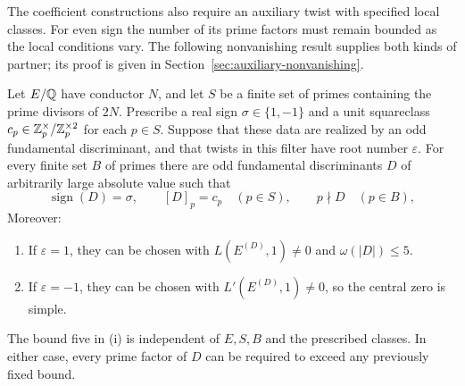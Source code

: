 The coefficient constructions also require an auxiliary twist with
specified local classes. For even sign the number of its prime factors
must remain bounded as the local conditions vary. The following
nonvanishing result supplies both kinds of partner; its proof is given
in Section~\ref{sec:auxiliary-nonvanishing}.

\begin{proposition}
\label{prop:rough-nonvanishing}\label{nv:rough}\label{nv:local-witness}
Let $E/\mathbb Q$ have conductor $N$, and let $S$ be a finite set of primes
containing the prime divisors of $2N$. Prescribe a real sign
$\sigma\in\{1,-1\}$ and a unit squareclass
$c_p\in\mathbb Z_p^\times/\mathbb Z_p^{\times2}$ for each $p\in S$.
Suppose that these data are realized by an odd fundamental discriminant,
and that twists in this filter have root number $\varepsilon$.
For every finite set $B$ of primes there are odd fundamental
discriminants $D$ of arbitrarily large absolute value such that
\[
 \operatorname{sign}(D)=\sigma,\qquad [D]_p=c_p\quad(p\in S),\qquad
 p\nmid D\quad(p\in B),
\]
Moreover:
\begin{enumerate}[label=\textup{(\roman*)}]
\item If $\varepsilon=1$, they can be chosen with
$L(E^{(D)},1)\ne0$ and $\omega(|D|)\le5$.
\item If $\varepsilon=-1$, they can be chosen with
$L'(E^{(D)},1)\ne0$, so the central zero is simple.
\end{enumerate}
The bound five in \textup{(i)} is independent of $E,S,B$ and the
prescribed classes. In either case, every prime factor of $D$ can be
required to exceed any previously fixed bound.
\end{proposition}
